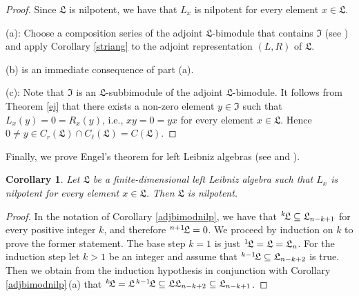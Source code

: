 \documentclass{amsart}
\newtheorem{cor}[thm]{Corollary}
\numberwithin{equation}{section}
\newcommand{\lf}{\mathfrak{L}}
\newcommand{\If}{\mathfrak{I}}
\begin{document}
\begin{proof}
Since $\lf$ is nilpotent, we have that $L_x$ is nilpotent for every element $x\in\lf$.

(a): Choose a composition series of the adjoint $\lf$-bimodule that contains $\If$ (see \cite[Proposition
1.1.1]{SF}) and apply Corollary \ref{striang} to the adjoint representation $(L,R)$ of $\lf$.

(b) is an immediate consequence of part (a).

(c): Note that $\If$ is an $\lf$-subbimodule of the adjoint $\lf$-bimodule. It follows from Theorem
\ref{ej} that there exists a non-zero element $y\in\If$ such that $L_x(y)=0=R_x(y)$, i.e.,
$xy=0=yx$ for every element $x\in\lf$. Hence $0\ne y\in C_r(\lf)\cap C_\ell(\lf)=C(\lf)$.
\end{proof}

Finally, we prove Engel's theorem for left Leibniz algebras (see \cite[Theorem 2]{AO1} and \cite[Corollary
10]{P1}).

\begin{cor}\label{engel}
Let $\lf$ be a finite-dimensional  left Leibniz algebra such that $L_x$ is nilpotent for every element
$x\in\lf$. Then $\lf$ is nilpotent.
\end{cor}

\begin{proof}
In the notation of Corollary \ref{adjbimodnilp}, we have that $\hspace{.1mm}^k\hspace{-.5mm}\lf
\subseteq\lf_{n-k+1}$ for every positive integer $k$, and therefore $\hspace{.1mm}^{n+1}
\hspace{-.5mm}\lf=0$. We proceed by induction on $k$ to prove the former statement. The base
step $k=1$ is just $\hspace{.1mm}^1\hspace{-.5mm}\lf=\lf=\lf_n$. For the induction step let
$k>1$ be an integer and assume that $\hspace{.1mm}^{k-1}\hspace{-.5mm}\lf\subseteq
\lf_{n-k+2}$ is true. Then we obtain from the induction hypothesis in conjunction with Corollary
\ref{adjbimodnilp}\,(a) that $\hspace{.1mm}^k\hspace{-.5mm}\lf=\lf\hspace{.5mm}^{k-1}
\hspace{-.5mm}\lf\subseteq\lf\lf_{n-k+2}\subseteq\lf_{n-k+1}$.
\end{proof}
\end{document}
